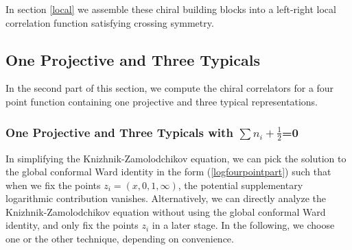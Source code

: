 \documentclass[12pt]{article}
\numberwithin{equation}{section}
\numberwithin{equation}{section}
\numberwithin{table}{section}\setlength{\multlinegap}{25pt}
\begin{document}
In section \ref{local} we assemble these chiral building blocks into a left-right local correlation function satisfying crossing
symmetry.


\subsection{One Projective and Three Typicals}
In the second part of this section, we compute the chiral correlators for a four point function containing one projective
and three typical representations.

\subsubsection{One Projective and Three Typicals with $\sum n_i +\frac{1}{2}$=0}
In simplifying the Knizhnik-Zamolodchikov equation, we can pick the solution to the global
conformal Ward identity in the form (\ref{logfourpointpart}) such that when we fix the points $z_i=(x,0,1,\infty)$, 
the potential supplementary logarithmic
contribution vanishes. Alternatively,
we can directly analyze the Knizhnik-Zamolodchikov equation without using the global conformal Ward identity, and only fix the 
points $z_i$ in a later stage. In the following, we choose one or the other technique, depending on convenience.
\end{document}
